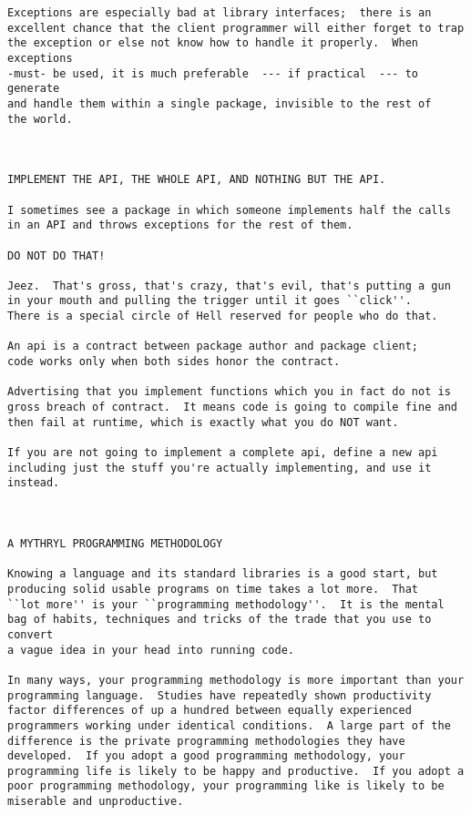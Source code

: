 \begin{verbatim}
Exceptions are especially bad at library interfaces;  there is an 
excellent chance that the client programmer will either forget to trap 
the exception or else not know how to handle it properly.  When exceptions 
-must- be used, it is much preferable  --- if practical  --- to generate 
and handle them within a single package, invisible to the rest of 
the world. 



IMPLEMENT THE API, THE WHOLE API, AND NOTHING BUT THE API. 

I sometimes see a package in which someone implements half the calls 
in an API and throws exceptions for the rest of them. 

DO NOT DO THAT! 

Jeez.  That's gross, that's crazy, that's evil, that's putting a gun 
in your mouth and pulling the trigger until it goes ``click''. 
There is a special circle of Hell reserved for people who do that. 

An api is a contract between package author and package client; 
code works only when both sides honor the contract. 

Advertising that you implement functions which you in fact do not is 
gross breach of contract.  It means code is going to compile fine and 
then fail at runtime, which is exactly what you do NOT want. 

If you are not going to implement a complete api, define a new api 
including just the stuff you're actually implementing, and use it 
instead. 



A MYTHRYL PROGRAMMING METHODOLOGY 

Knowing a language and its standard libraries is a good start, but 
producing solid usable programs on time takes a lot more.  That 
``lot more'' is your ``programming methodology''.  It is the mental 
bag of habits, techniques and tricks of the trade that you use to convert 
a vague idea in your head into running code. 

In many ways, your programming methodology is more important than your 
programming language.  Studies have repeatedly shown productivity 
factor differences of up a hundred between equally experienced 
programmers working under identical conditions.  A large part of the 
difference is the private programming methodologies they have 
developed.  If you adopt a good programming methodology, your 
programming life is likely to be happy and productive.  If you adopt a 
poor programming methodology, your programming like is likely to be 
miserable and unproductive. 


\end{verbatim}
